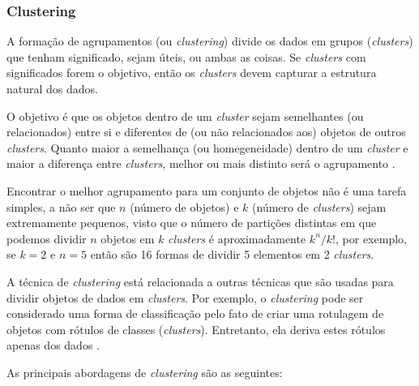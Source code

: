 \subsubsection{Clustering}\label{subsubsec:clustering}
A formação de agrupamentos (ou \textit{clustering}) divide os dados em grupos (\textit{clusters}) que tenham significado, sejam úteis, ou ambas as coisas. Se \textit{clusters} com significados forem o objetivo, então os \textit{clusters} devem capturar a estrutura natural dos dados.

O objetivo é que os objetos dentro de um \textit{cluster} sejam semelhantes (ou relacionados) entre si e diferentes de (ou não relacionados aos) objetos de outros \textit{clusters}. Quanto maior a semelhança (ou homegeneidade) dentro de um \textit{cluster} e maior a diferença entre \textit{clusters}, melhor ou mais distinto será o agrupamento \cite{pang2009}.

Encontrar o melhor agrupamento para um conjunto de objetos não é uma tarefa simples, a não ser que \textbf{\({n}\)} (número de objetos) e \textbf{\({k}\)} (número de \textit{clusters}) sejam extremamente pequenos, visto que o número de partições distintas em que podemos dividir \textbf{\({n}\)} objetos em \textbf{\({k}\)} \textit{clusters} é aproximadamente \textbf{\({k^n/k!}\)}, por exemplo, se \textbf{\({k=2}\)} e \textbf{\({n=5}\)} então são 16 formas de dividir 5 elementos em 2 \textit{clusters}.

A técnica de \textit{clustering} está relacionada a outras técnicas que são usadas para dividir objetos de dados em \textit{clusters}. Por exemplo, o \textit{clustering} pode ser considerado uma forma de classificação pelo fato de criar uma rotulagem de objetos com rótulos de classes (\textit{clusters}). Entretanto, ela deriva estes rótulos apenas dos dados \cite{pang2009}.

As principais abordagens de \textit{clustering} são as seguintes:

